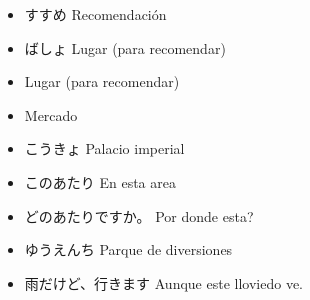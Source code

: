 \documentclass[a4paper,lualatex,ja=standard,base=10pt]{bxjsarticle}
\begin{document}
\begin{itemize}
  \item すすめ Recomendación
  \item ばしょ Lugar (para recomendar)
  \item {} Lugar (para recomendar)
  \item {} Mercado
  \item こうきょ Palacio imperial
  \item このあたり En esta area
  \item どのあたりですか。 Por donde esta?
  \item ゆうえんち Parque de diversiones
  \item 雨だけど、行きます Aunque este lloviedo ve.
\end{itemize}
\end{document}
